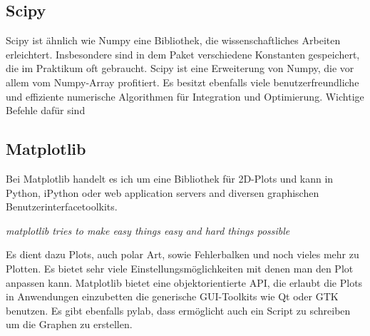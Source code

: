 \subsection{Scipy}
  Scipy ist ähnlich wie Numpy eine Bibliothek, die wissenschaftliches Arbeiten erleichtert.
  Insbesondere sind in dem Paket verschiedene Konstanten gespeichert, die im Praktikum oft gebraucht.
  Scipy ist eine Erweiterung von Numpy, die vor allem vom Numpy-Array profitiert.
  Es besitzt ebenfalls viele benutzerfreundliche und effiziente numerische Algorithmen für Integration und Optimierung.
  Wichtige Befehle dafür sind
\subsection{Matplotlib}
  Bei Matplotlib handelt es ich um eine Bibliothek für 2D-Plots und kann in Python, iPython oder web application servers and diversen graphischen Benutzerinterfacetoolkits.


  \textit{matplotlib tries to make easy things easy and hard things possible}


  Es dient dazu Plots, auch polar Art, sowie Fehlerbalken und noch vieles mehr zu Plotten.
  Es bietet sehr viele Einstellungsmöglichkeiten mit denen man den Plot anpassen kann.
  Matplotlib bietet eine objektorientierte API, die erlaubt die Plots in Anwendungen einzubetten die generische GUI-Toolkits wie Qt oder GTK benutzen.
  Es gibt ebenfalls pylab, dass ermöglicht auch ein Script zu schreiben um die Graphen zu erstellen.
